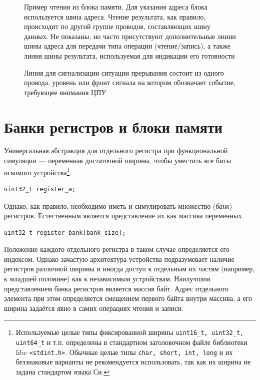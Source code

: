\begin{figure}[htb]
    \centering
    \caption[Пример чтения из блока памяти]{Пример чтения из блока памяти. Для указания адреса блока используется шина адреса. Чтение результата, как правило, происходит по другой группе проводов, составляющих шину данных. Не показаны, но часто присутствуют дополнительные линии шины адреса для передачи типа операции (чтение/запись), а также линия шины результата, используемая для индикации его готовности}
    \label{fig:membus}
\end{figure}

\begin{figure}[htb]
    \centering
    \caption[Линия прерывания]{Линия для сигнализации ситуации прерывания состоит из одного провода, уровень или фронт сигнала на котором обозначает событие, требующее внимания ЦПУ}
    \label{fig:interrupt-line}
\end{figure}


\section{Банки регистров и блоки памяти}

Универсальная абстракция для отдельного регистра при функциональной симуляции — переменная достаточной ширины, чтобы уместить все биты искомого устройства\footnote{Используемые целые типы фиксированной ширины \texttt{uint16_t, uint32_t, uint64_t} и т.п. определены в стандартном заголовочном файле библиотеки libc \texttt{<stdint.h>}. Обычные целые типы \texttt{char, short, int, long} и их беззнаковые варианты не рекомендуется использовать, так как их ширина не задана стандартом языка Си.}.

\begin{lstlisting}
uint32_t register_a;
\end{lstlisting} 

Однако, как правило, необходимо иметь и симулировать множество (\textit{банк}) регистров. Естественным является представление их как массива переменных. 
\begin{lstlisting}
uint32_t register_bank[bank_size];
\end{lstlisting}

Положение каждого отдельного регистра в таком случае определяется его индексом. Однако зачастую архитектура устройства подразумевает наличие регистров различной ширины и иногда доступ к отдельным их частям (например, к младшей половине)  как к независимым устройствам. Наилучшим представлением банка регистров является массив байт. Адрес отдельного элемента при этом определяется смещением первого байта внутри массива, а его ширина задаётся явно в самих операциях чтения и записи.

